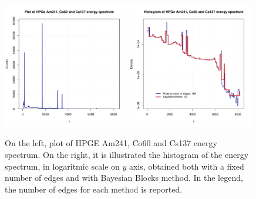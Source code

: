 \documentclass[prb,twocolumn]{revtex4-1}
\begin{document}
\begin{figure}[t!]
    \centering 
    \includegraphics[width=0.49\textwidth]{images/plot_HPGe_1.pdf}
    \hskip 1mm
   \includegraphics[width=0.49\textwidth]{images/hist_HPGe_1.pdf}
    \caption{On the left, plot of HPGE  Am241, Co60 and Cs137 energy spectrum. On the right, it is illustrated the histogram of the energy spectrum, in logaritmic scale on $y$ axis, obtained both with a fixed number of edges and with Bayesian Blocks method. In the legend, the number of edges for each method is reported.}
    \label{fig:HPGe_1}
\end{figure}
\end{document}

